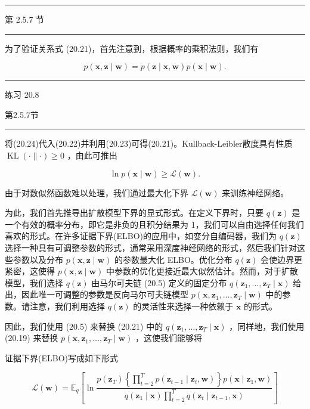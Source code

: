 \documentclass[10pt]{report}
\newcommand{\HRule}{\begin{center}\rule{0.9\linewidth}{0.2mm}\end{center}}
\begin{document}
\HRule

第 2.5.7 节

\HRule

为了验证关系式 (20.21)，首先注意到，根据概率的乘积法则，我们有

\[
p\left( {\mathbf{x},\mathbf{z} \mid  \mathbf{w}}\right)  = p\left( {\mathbf{z} \mid  \mathbf{x},\mathbf{w}}\right) p\left( {\mathbf{x} \mid  \mathbf{w}}\right) . \tag{20.24}
\]

\HRule

练习 20.8

第2.5.7节

\HRule

将(20.24)代入(20.22)并利用(20.23)可得(20.21)。Kullback-Leibler散度具有性质 \(\operatorname{KL}\left( {\cdot \parallel  \cdot  }\right)  \geq  0\) ，由此可推出

\[
\ln p\left( {\mathbf{x} \mid  \mathbf{w}}\right)  \geq  \mathcal{L}\left( \mathbf{w}\right) . \tag{20.25}
\]

由于对数似然函数难以处理，我们通过最大化下界 \(\mathcal{L}\left( \mathbf{w}\right)\) 来训练神经网络。

为此，我们首先推导出扩散模型下界的显式形式。在定义下界时，只要 \(q\left( \mathbf{z}\right)\) 是一个有效的概率分布，即它是非负的且积分结果为 1，我们可以自由选择任何我们喜欢的形式。在许多证据下界(ELBO)的应用中，如变分自编码器，我们为 \(q\left( \mathbf{z}\right)\) 选择一种具有可调整参数的形式，通常采用深度神经网络的形式，然后我们针对这些参数以及分布 \(p\left( {\mathbf{x},\mathbf{z} \mid  \mathbf{w}}\right)\) 的参数最大化 ELBO。优化分布 \(q\left( \mathbf{z}\right)\) 会使边界更紧密，这使得 \(p\left( {\mathbf{x},\mathbf{z} \mid  \mathbf{w}}\right)\) 中参数的优化更接近最大似然估计。然而，对于扩散模型，我们选择 \(q\left( \mathbf{z}\right)\) 由马尔可夫链 (20.5) 定义的固定分布 \(q\left( {{\mathbf{z}}_{1},\ldots ,{\mathbf{z}}_{T} \mid  \mathbf{x}}\right)\) 给出，因此唯一可调整的参数是反向马尔可夫链模型 \(p\left( {\mathbf{x},{\mathbf{z}}_{1},\ldots ,{\mathbf{z}}_{T} \mid  \mathbf{w}}\right)\) 中的参数。请注意，我们利用选择 \(q\left( \mathbf{z}\right)\) 的灵活性来选择一种依赖于 \(\mathbf{x}\) 的形式。

因此，我们使用 (20.5) 来替换 (20.21) 中的 \(q\left( {{\mathbf{z}}_{1},\ldots ,{\mathbf{z}}_{T} \mid  \mathbf{x}}\right)\) ，同样地，我们使用 (20.19) 来替换 \(p\left( {\mathbf{x},{\mathbf{z}}_{1},\ldots ,{\mathbf{z}}_{T} \mid  \mathbf{w}}\right)\) ，这使我们能够将

证据下界(ELBO)写成如下形式

\[
\mathcal{L}\left( \mathbf{w}\right)  = {\mathbb{E}}_{q}\left\lbrack  {\ln \frac{p\left( {\mathbf{z}}_{T}\right) \left\{  {\mathop{\prod }\limits_{{t = 2}}^{T}p\left( {{\mathbf{z}}_{t - 1} \mid  {\mathbf{z}}_{t},\mathbf{w}}\right) }\right\}  p\left( {\mathbf{x} \mid  {\mathbf{z}}_{1},\mathbf{w}}\right) }{q\left( {{\mathbf{z}}_{1} \mid  \mathbf{x}}\right) \mathop{\prod }\limits_{{t = 2}}^{T}q\left( {{\mathbf{z}}_{t} \mid  {\mathbf{z}}_{t - 1},\mathbf{x}}\right) }}\right\rbrack
\]
\end{document}
